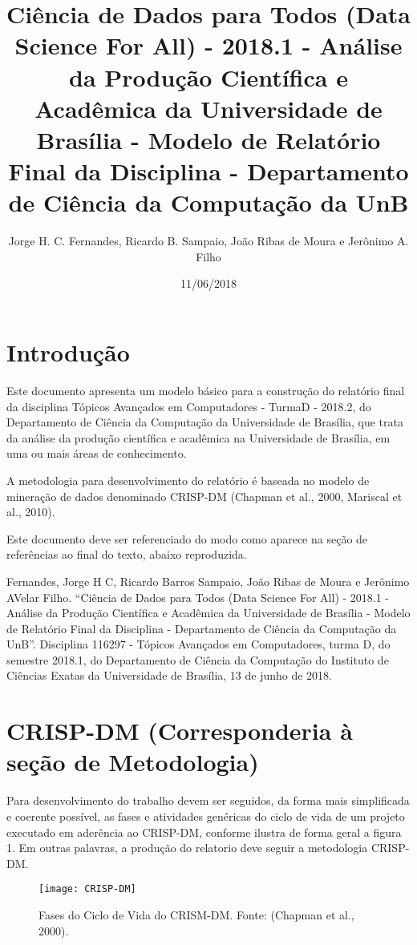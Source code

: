 \documentclass[]{article}
\title{Ciência de Dados para Todos (Data Science For All) - 2018.1 - Análise da
Produção Científica e Acadêmica da Universidade de Brasília - Modelo de
Relatório Final da Disciplina - Departamento de Ciência da Computação da
UnB}
\author{Jorge H. C. Fernandes, Ricardo B. Sampaio, João Ribas de Moura e
Jerônimo A. Filho}
\date{11/06/2018}
\begin{document}
\maketitle

\section{Introdução}\label{introducao}

Este documento apresenta um modelo básico para a construção do relatório
final da disciplina Tópicos Avançados em Computadores - TurmaD - 2018.2,
do Departamento de Ciência da Computação da Universidade de Brasília,
que trata da análise da produção científica e acadêmica na Universidade
de Brasília, em uma ou mais áreas de conhecimento.

A metodologia para desenvolvimento do relatório é baseada no modelo de
mineração de dados denominado CRISP-DM (Chapman et al., 2000, Mariscal
et al., 2010).

Este documento deve ser referenciado do modo como aparece na seção de
referências ao final do texto, abaixo reproduzida.

Fernandes, Jorge H C, Ricardo Barros Sampaio, João Ribas de Moura e
Jerônimo AVelar Filho. ``Ciência de Dados para Todos (Data Science For
All) - 2018.1 - Análise da Produção Científica e Acadêmica da
Universidade de Brasília - Modelo de Relatório Final da Disciplina -
Departamento de Ciência da Computação da UnB''. Disciplina 116297 -
Tópicos Avançados em Computadores, turma D, do semestre 2018.1, do
Departamento de Ciência da Computação do Instituto de Ciências Exatas da
Universidade de Brasília, 13 de junho de 2018.

\section{CRISP-DM (Corresponderia à seção de
Metodologia)}\label{crisp-dm-corresponderia-a-secao-de-metodologia}

Para desenvolvimento do trabalho devem ser seguidos, da forma mais
simplificada e coerente possível, as fases e atividades genéricas do
ciclo de vida de um projeto executado em aderência ao CRISP-DM, conforme
ilustra de forma geral a figura 1. Em outras palavras, a produção do
relatorio deve seguir a metodologia CRISP-DM.

\begin{figure}
\centering
\texttt{[image: CRISP-DM]}
\caption{Fases do Ciclo de Vida do CRISM-DM. Fonte: (Chapman et al.,
2000).}
\end{figure}
\end{document}
